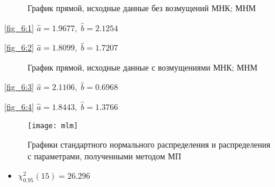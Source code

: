 \documentclass[12pt]{article}
\begin{document}
\begin{figure}[h!]

	
	\caption{График прямой, исходные данные без возмущений
	 МНК; 
     МНМ}
    \label{fig_6:1_2}
\end{figure}
\begin{multicols}{2}
    \raggedright
	\ref{fig_6:1}
	$\hat a = 1.9677, \; \hat b = 2.1254$

	\raggedleft
	\ref{fig_6:2}
	$\hat a = 1.8099, \; \hat b = 1.7207$
\end{multicols}
\vspace{10cm}
\begin{figure}[h!]
	
	\caption{График прямой, исходные данные с возмущениями
	 МНК; 
     МНМ}
    \label{fig_6:1_2}
\end{figure}
\begin{multicols}{2}
    \raggedright
	\ref{fig_6:3}
	$\hat a = 2.1106, \; \hat b = 0.6968$

	\raggedleft
	\ref{fig_6:4}
	$\hat a = 1.8443, \; \hat b = 1.3766$
\end{multicols}

\newpage
{}
\begin{figure}[h!]
    \centering
    \texttt{[image: mlm]}
    \label{pic_7:1}
    \caption{Графики стандартного нормального распределения и распределения с параметрами, полученными методом МП}
\end{figure}
    
\newpage

\begin{itemize}
    \item $\chi^2_{0.95}(15) = 26.296$
\end{itemize}
\end{document}

